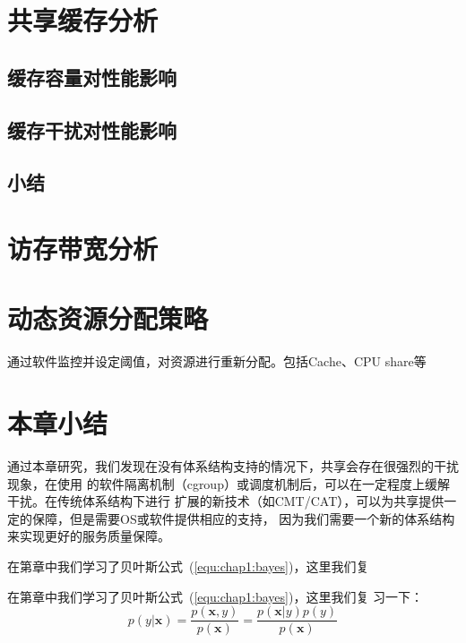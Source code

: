 \section{共享缓存分析}

\subsection{缓存容量对性能影响}

\subsection{缓存干扰对性能影响}

\subsection{小结}

\section{访存带宽分析}

\section{动态资源分配策略}

通过软件监控并设定阈值，对资源进行重新分配。包括Cache、CPU share等


\section{本章小结}

通过本章研究，我们发现在没有体系结构支持的情况下，共享会存在很强烈的干扰现象，在使用
的软件隔离机制（cgroup）或调度机制后，可以在一定程度上缓解干扰。在传统体系结构下进行
扩展的新技术（如CMT/CAT），可以为共享提供一定的保障，但是需要OS或软件提供相应的支持，
因为我们需要一个新的体系结构来实现更好的服务质量保障。



在第章中我们学习了贝叶斯公式~(\ref{equ:chap1:bayes})，这里我们复


在第章中我们学习了贝叶斯公式~(\ref{equ:chap1:bayes})，这里我们复
习一下：
\begin{equation}
\label{equ:chap2:bayes}
p(y|\mathbf{x}) = \frac{p(\mathbf{x},y)}{p(\mathbf{x})}=
\frac{p(\mathbf{x}|y)p(y)}{p(\mathbf{x})} 
\end{equation}




